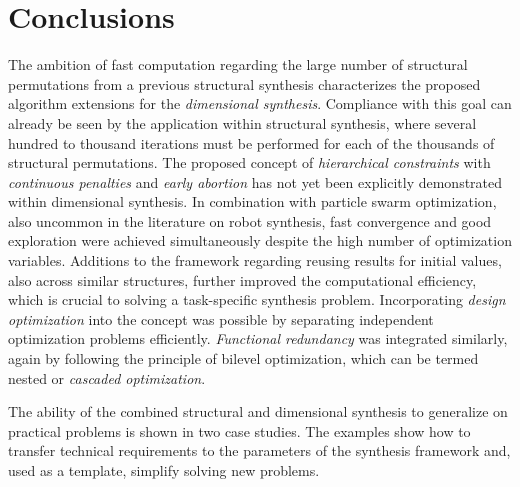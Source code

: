 \documentclass[robotics,article,accept,pdftex,oneauthor]{Definitions/mdpi}
\begin{document}
%
\section{Conclusions}
\label{sec:conclusions}

The ambition of fast computation regarding the large number of structural permutations from a previous structural synthesis characterizes the proposed algorithm extensions for the \emph{dimensional synthesis}.
Compliance with this goal can already be seen by the application within structural synthesis, where several hundred to thousand iterations must be performed for each of the thousands of structural permutations.
The proposed concept of \emph{hierarchical constraints} with \emph{continuous penalties} and \emph{early abortion} has not {yet} been explicitly demonstrated within dimensional synthesis.
In combination with particle swarm optimization, also uncommon in the literature on robot synthesis, fast convergence and good exploration were achieved simultaneously despite the high number of optimization variables.
Additions to the framework regarding reusing results for initial values, also across similar structures, further improved the computational efficiency, which is crucial to solving a task-specific synthesis problem.
Incorporating \emph{design optimization} into the concept was possible by separating independent optimization problems efficiently. %
\emph{Functional redundancy} was integrated similarly, again by following the principle of bilevel optimization, which can be termed nested or \emph{cascaded optimization}. %

%
%
%
%
%
%
%

The ability of the combined structural and dimensional synthesis to generalize on practical problems is shown in two case studies.
%
%
The examples show how to transfer technical requirements to the parameters of the synthesis framework and, used as a template, simplify solving new problems.


%
\vspace{6pt} 

%
%
%

%
%
%

%
%

%
%
%
%
%
%
%
%
%
%
%
%
%
%
%

%
%

\end{document}
